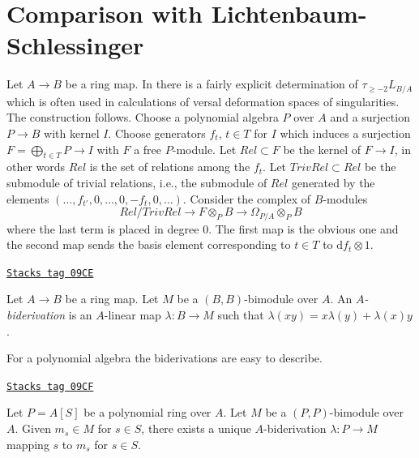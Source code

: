 \section{Comparison with Lichtenbaum-Schlessinger}
\label{cotangent-section-compare-higher}
Let $A \to B$ be a ring map. In \cite{Lichtenbaum-Schlessinger}
there is a fairly explicit determination of $\tau_{\geq -2}L_{B/A}$
which is often used in calculations of versal deformation spaces of
singularities. The construction follows.
Choose a polynomial algebra $P$ over $A$
and a surjection $P \to B$ with kernel $I$. Choose generators
$f_t$, $t \in T$ for $I$ which induces a surjection
$F = \bigoplus_{t \in T} P \to I$ with $F$ a free $P$-module.
Let $Rel \subset F$ be the kernel of $F \to I$, in other words
$Rel$ is the set of relations among the $f_t$. Let $TrivRel \subset Rel$
be the submodule of trivial relations, i.e., the submodule of $Rel$
generated by the elements $(\ldots, f_{t'}, 0, \ldots, 0, -f_t, 0, \ldots)$.
Consider the complex of $B$-modules
\begin{equation}
\label{equation-lichtenbaum-schlessinger}
Rel/TrivRel \longrightarrow
F \otimes_P B \longrightarrow
\Omega_{P/A} \otimes_P B
\end{equation}
where the last term is placed in degree $0$. The first map is the obvious
one and the second map sends the basis element corresponding to $t \in T$
to $\text{d}f_t \otimes 1$.

\begin{definition}[Biderivation]
\label{cotangent-definition-biderivation}
\href{https://stacks.math.columbia.edu/tag/09CE}{\texttt{Stacks tag 09CE}}

Let $A \to B$ be a ring map. Let $M$ be a $(B, B)$-bimodule
over $A$. An {\it $A$-biderivation} is an $A$-linear map $\lambda : B \to M$
such that $\lambda(xy) = x\lambda(y) + \lambda(x)y$.
\end{definition}

For a polynomial algebra the biderivations are easy to describe.

\begin{lemma}
\label{cotangent-lemma-polynomial-ring-unique}
\href{https://stacks.math.columbia.edu/tag/09CF}{\texttt{Stacks tag 09CF}}

Let $P = A[S]$ be a polynomial ring over $A$. Let $M$ be a $(P, P)$-bimodule
over $A$. Given $m_s \in M$ for $s \in S$, there exists a unique
$A$-biderivation $\lambda : P \to M$ mapping $s$ to $m_s$ for $s \in S$.
\end{lemma}

